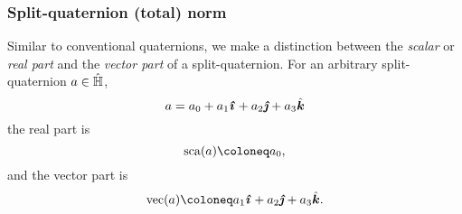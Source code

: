 \subsubsection{Split-quaternion (total) norm} 
Similar to conventional quaternions, we make a distinction between the \emph{scalar} or \emph{real part} and the \emph{vector part} of a split-quaternion. For an arbitrary split-quaternion \(a \in \hat{\mathbb{H}}\), \cite{Jafari2014}
\begin{equation}
     a = \quat{a_0}{a_1}{a_2}{a_3}
     \label{eq:spquaternion}
\end{equation}
the real part is 
\begin{equation}
    \scapart{a} \coloneq a_0,
\end{equation}
and the vector part is 
\begin{equation} 
    \vecpart{a} \coloneq \quatvec{a_1}{a_2}{a_3}.
\end{equation}





